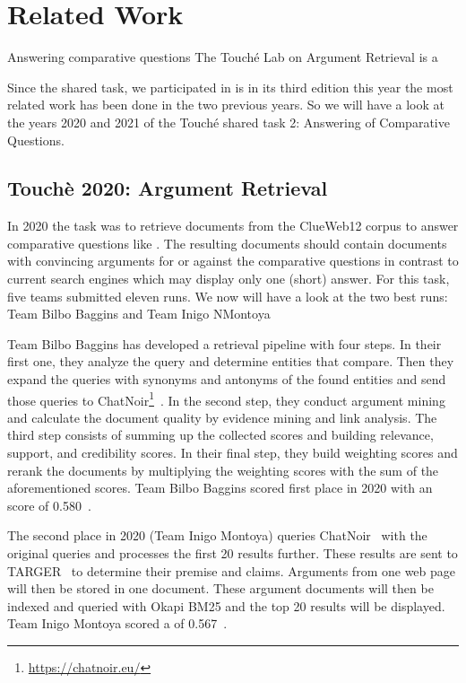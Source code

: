 \section{Related Work}

Answering comparative questions 
The Touché Lab on Argument Retrieval is a

Since the shared task, we participated in is in its third edition this year the most related work has been done in the two previous years.
So we will have a look at the years 2020 and 2021 of the Touché shared task 2: Answering of Comparative Questions.

\subsection{Touchè 2020: Argument Retrieval}

In 2020 the task was to retrieve documents from the ClueWeb12 corpus to answer comparative questions like .
The resulting documents should contain documents with convincing arguments for or against the comparative questions in contrast to current search engines which may display only one (short) answer.
For this task, five teams submitted eleven runs.
We now will have a look at the two best runs: Team Bilbo Baggins and Team Inigo NMontoya~\cite{BondarenkoFBGAPBSWPH2020}

Team Bilbo Baggins has developed a retrieval pipeline with four steps.
In their first one, they analyze the query and determine entities that compare.
Then they expand the queries with synonyms and antonyms of the found entities and send those queries to ChatNoir\footnote{\url{https://chatnoir.eu/}}~\cite{BevendorffSHP2018}.
In the second step, they conduct argument mining and calculate the document quality by evidence mining and link analysis.
The third step consists of summing up the collected scores and building relevance, support, and credibility scores.
In their final step, they build weighting scores and rerank the documents by multiplying the weighting scores with the sum of the aforementioned scores.
Team Bilbo Baggins scored first place in 2020 with an  score of 0.580~\cite{AbyeST2020}.

The second place in 2020 (Team Inigo Montoya) queries ChatNoir~\cite{BevendorffSHP2018} with the original queries and processes the first 20 results further.
These results are sent to TARGER~\cite{ChernodubOHBHBP2019} to determine their premise and claims.
Arguments from one web page will then be stored in one document.
These argument documents will then be indexed and queried with Okapi BM25 and the top 20 results will be displayed.
Team Inigo Montoya scored a  of 0.567~\cite{Huck2020}.

